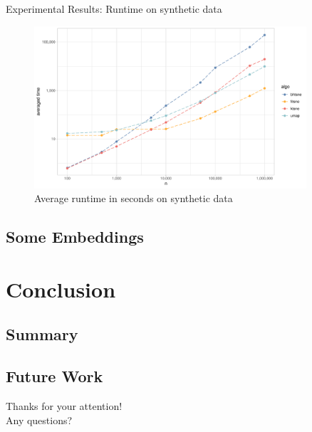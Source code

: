 \documentclass{beamer}
\begin{document}
\begin{frame}[fragile]{Experimental Results: Runtime on synthetic data}
  \begin{figure}[h]
      \centering
      \includegraphics[width=0.9\textwidth]{runtime_comparison}
  \caption{Average runtime in seconds on synthetic data}
  \end{figure}
\end{frame}

\subsection{Some Embeddings}

\section{Conclusion}

\subsection{Summary}

\subsection{Future Work}

\begin{frame}[standout]
    Thanks for your attention!\\
    Any questions?
\end{frame}
\end{document}
